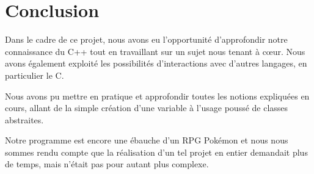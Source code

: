 \vspace*{3cm}

\section*{Conclusion}
{}
\vspace*{1cm}

Dans le cadre de ce projet, nous avons eu l'opportunité d'approfondir notre connaissance du C++ tout en travaillant sur un sujet nous tenant à cœur. Nous avons également exploité les possibilités d'interactions avec d'autres langages, en particulier le C. 

Nous avons pu mettre en pratique et approfondir toutes les notions expliquées en cours, allant de la simple création d'une variable à l'usage poussé de classes abstraites. 

Notre programme est encore une ébauche d'un RPG Pokémon et nous nous sommes rendu compte que la réalisation d'un tel projet en entier demandait plus de temps, mais n'était pas pour autant plus complexe. 
\vspace*{3cm}

